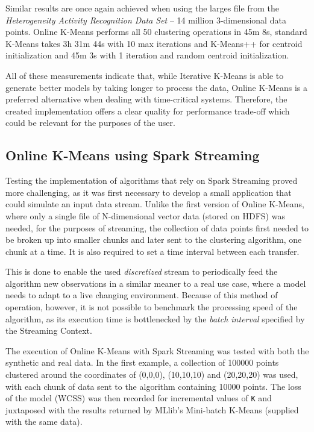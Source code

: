 \documentclass{l4proj}
\begin{document}
Similar results are once again achieved when using the larges file from the \textit{Heterogeneity Activity Recognition Data Set} -- 14 million 3-dimensional data points. Online K-Means performs all 50 clustering operations in 45m 8s, standard K-Means takes 3h 31m 44s with 10 max iterations and K-Means++ for centroid initialization and 45m 3s with 1 iteration and random centroid initialization.

All of these measurements indicate that, while Iterative K-Means is able to generate better models by taking longer to process the data, Online K-Means is a preferred alternative when dealing with time-critical systems. Therefore, the created implementation offers a clear quality for performance trade-off which could be relevant for the purposes of the user.

\subsection{Online K-Means using Spark Streaming}

Testing the implementation of algorithms that rely on Spark Streaming proved more challenging, as it was first necessary to develop a small application that could simulate an input data stream. Unlike the first version of Online K-Means, where only a single file of N-dimensional vector data (stored on HDFS) was needed, for the purposes of streaming, the collection of data points first needed to be broken up into smaller chunks and later sent to the clustering algorithm, one chunk at a time. It is also required to set a time interval between each transfer.

This is done to enable the used \textit{discretized} stream to periodically feed the algorithm new observations in a similar meaner to a real use case, where a model needs to adapt to a live changing environment. Because of this method of operation, however, it is not possible to benchmark the processing speed of the algorithm, as its execution time is bottlenecked by the \textit{batch interval} specified by the Streaming Context.
 
The execution of Online K-Means with Spark Streaming was tested with both the synthetic and real data. In the first example, a collection of 100000 points clustered around the coordinates of (0,0,0), (10,10,10) and (20,20,20) was used, with each chunk of data sent to the algorithm containing 10000 points. The loss of the model (WCSS) was then recorded for incremental values of \texttt{K} and juxtaposed with the results returned by MLlib's Mini-batch K-Means (supplied with the same data).
\end{document}
